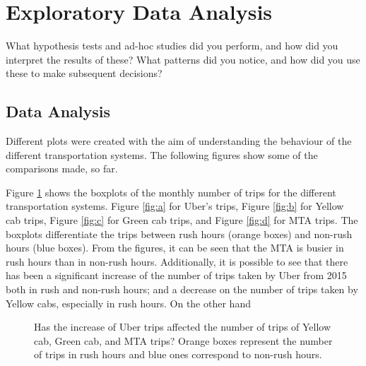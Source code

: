 \section{Exploratory Data Analysis}
\label{sec:datAnalisys}
What hypothesis tests and ad-hoc studies did you perform,
and how did you interpret the results of these? What patterns did you notice, and how
did you use these to make subsequent decisions?




\subsection{Data Analysis}

Different plots were created with the aim of understanding the behaviour of the different transportation systems. The following figures show some of the comparisons made, so far.

Figure \ref{fig:boxTrips} shows the boxplots of the monthly number of trips for the different transportation systems. Figure \ref{fig:a} for Uber's trips, Figure \ref{fig:b} for Yellow cab trips, Figure \ref{fig:c} for Green cab trips, and Figure \ref{fig:d} for MTA trips. The boxplots differentiate the trips between rush hours (orange boxes) and non-rush hours (blue boxes). From the figures, it can be seen that the MTA is busier in rush hours than in non-rush hours. Additionally, it is possible to see that there has been a significant increase of the number of trips taken by Uber from 2015 both in rush and non-rush hours; and a decrease on the number of trips taken by Yellow cabs, especially in rush hours. On the other hand

\begin{figure}%
\centering
{}%
\qquad
{}%
\qquad
{}%
\qquad
{}%
\caption{Has the increase of Uber trips affected the number of trips of Yellow cab, Green cab, and MTA trips? Orange boxes represent the number of trips in rush hours and blue ones correspond to non-rush hours. }
\label{fig:boxTrips}%
\end{figure}



